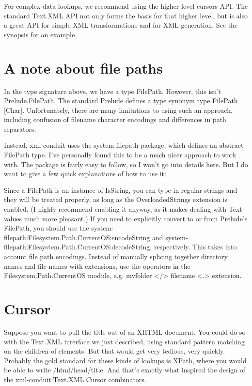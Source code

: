 For complex data lookups, we recommend using the higher-level cursors API. The
standard Text.XML API not only forms the basis for that higher level, but is
also a great API for simple XML transformations and for XML generation. See the synopsis for an
example.

\section{A note about file paths}

In the type signature above, we have a type FilePath. However, this isn't
Prelude.FilePath. The standard Prelude defines a type
synonym type FilePath = [Char]. Unfortunately, there are many limitations to
using such an approach, including confusion of filename character encodings and differences in
path separators.

Instead, xml-conduit uses the system-filepath package,
which defines an abstract FilePath type. I've personally found this to be a much
nicer approach to work with. The package is fairly easy to follow, so I won't go into details
here. But I do want to give a few quick explanations of how to use it:

Since a FilePath is an instance of IsString, you can type
in regular strings and they will be treated properly, as long as the
OverloadedStrings extension is enabled. (I highly recommend enabling it
anyway, as it makes dealing with Text values much more pleasant.)
If you need to explicitly convert to or from Prelude's
FilePath, you should use the
system-filepath:Filesystem.Path.CurrentOS:encodeString and
system-filepath:Filesystem.Path.CurrentOS:decodeString, respectively. This
takes into account file path encodings.
Instead of manually splicing together directory names and file names with extensions, use the
operators in the Filesystem.Path.CurrentOS module, e.g. myfolder </> filename <.> extension.
  
\section{Cursor}

Suppose you want to pull the title out of an XHTML document. You could do so with the
Text.XML interface we just described, using standard pattern matching on the
children of elements. But that would get very tedious, very quickly. Probably the gold standard
for these kinds of lookups is XPath, where you would be able to write /html/head/title. And that's exactly what inspired the design of the xml-conduit:Text.XML.Cursor combinators.

